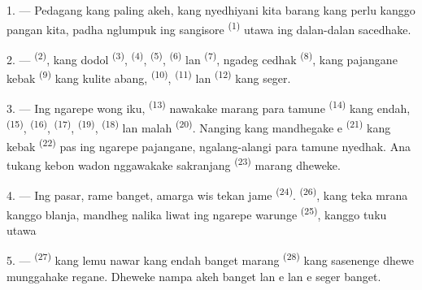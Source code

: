 \VUsaut{4.0mm}
\VUsaut{3.0mm}

\VUsaut{3.0mm}

1. --- Pedagang kang paling akeh, kang nyedhiyani kita barang kang
perlu kanggo pangan kita, padha nglumpuk ing sangisore 
\textsuperscript{(1)}  utawa ing dalan-dalan
sacedhake.

2. ---  \textsuperscript{(2)}, kang dodol
 \textsuperscript{(3)},  \textsuperscript{(4)},
 \textsuperscript{(5)}, 
\textsuperscript{(6)} lan  \textsuperscript{(7)}, ngadeg
cedhak  \textsuperscript{(8)}, kang
pajangane kebak  \textsuperscript{(9)} kang kulite
abang,  \textsuperscript{(10)},  \textsuperscript{(11)} lan 
\textsuperscript{(12)} kang seger.

3. --- Ing ngarepe wong iku,  \textsuperscript{(13)}
nawakake marang para tamune  \textsuperscript{(14)} kang
endah,  \textsuperscript{(15)}, 
\textsuperscript{(16)},  \textsuperscript{(17)},
 \textsuperscript{(19)}, 
\textsuperscript{(18)} lan malah  \textsuperscript{(20)}.
Nanging  kang mandhegake e \textsuperscript{(21)} kang kebak 
\textsuperscript{(22)} pas ing ngarepe pajangane, ngalang-alangi para
tamune nyedhak. Ana tukang kebon wadon nggawakake sakranjang
 \textsuperscript{(23)} marang dheweke.

\VUsaut{4.0mm}
\VUsaut{3.0mm}

4. --- Ing pasar, rame banget, amarga wis tekan jame  \textsuperscript{(24)}. 
\textsuperscript{(26)}, kang teka mrana kanggo blanja, mandheg nalika
liwat ing ngarepe warunge  \textsuperscript{(25)},
kanggo tuku  utawa 

5. ---  \textsuperscript{(27)} kang lemu nawar
 kang endah banget marang 
\textsuperscript{(28)} kang sasenenge dhewe munggahake regane. Dheweke
nampa akeh banget  lan
 e lan e seger banget.

